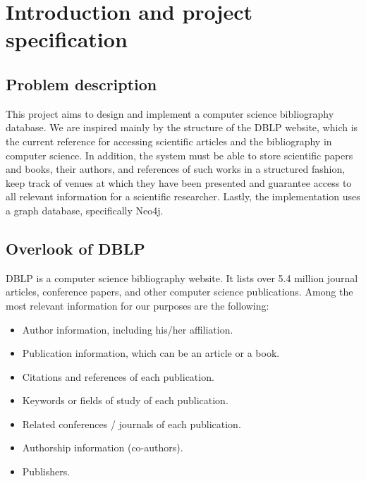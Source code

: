 \documentclass{Configuration_Files/PoliMi3i_thesis}
\begin{document}
\mainmatter %

\chapter{Introduction and project specification}
\label{ch:chapter_one}%
\section{Problem description}
\label{sec:section_name}
This project aims to design and implement a computer science bibliography database. We are inspired mainly by the structure of the DBLP website, which is the current reference for accessing scientific articles and the bibliography in computer science. In addition, the system must be able to store scientific papers and books, their authors, and references of such works in a structured fashion, keep track of venues at which they have been presented and guarantee access to all relevant information for a scientific researcher. Lastly, the implementation uses a graph database, specifically Neo4j.

\section{Overlook of DBLP}
\label{sec:section_name}
DBLP is a computer science bibliography website. It lists over 5.4 million journal articles, conference papers, and other computer science publications. Among the most relevant information for our purposes are the following:

\begin{itemize}
\item Author information, including his/her affiliation.
\item Publication information, which can be an article or a book.
\item Citations and references of each publication.
\item Keywords or fields of study of each publication.
\item Related conferences / journals of each publication.
\item Authorship information (co-authors).
\item Publishers.
\end{itemize}
\end{document}
